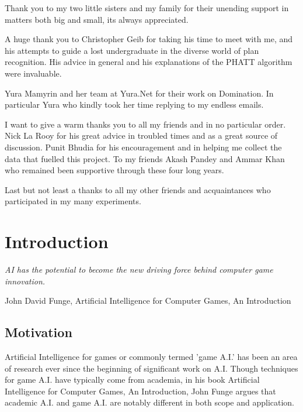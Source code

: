 \documentclass[parskip]{cs4rep}
\begin{document}
Thank you to my two little sisters and my family for their unending support in matters both big and small, its always appreciated. 

A huge thank you to Christopher Geib for taking his time to meet with me, and his attempts to guide a lost undergraduate in the diverse world of plan recognition. His advice in general and his explanations of the PHATT algorithm were invaluable. 

Yura Mamyrin and her team at Yura.Net for their work on Domination. In particular Yura who kindly took her time replying to my endless emails.

I want to give a warm thanks you to all my friends and in no particular order. Nick La Rooy for his great advice in troubled times and as a great source of discussion. Punit Bhudia for his encouragement and in helping me collect the data that fuelled this project. To my friends Akash Pandey and Ammar Khan who remained been supportive through these four long years. 

Last but not least a thanks to all my other friends and acquaintances who participated in my many experiments.

\tableofcontents


\chapter{Introduction}

\begin{flushleft}
\textit{AI has the potential to become the new driving force behind computer game innovation.}
\end{flushleft}
\begin{flushleft}
John David Funge, Artificial Intelligence for Computer Games, An Introduction
\end{flushleft}

\section{Motivation}

Artificial Intelligence for games or commonly termed 'game A.I.' has been an area of research ever since the beginning of significant work on A.I. Though techniques for game A.I. have typically come from academia, in his book Artificial Intelligence for Computer Games, An Introduction, John Funge argues \cite{JohnFunge:AIForComp} that academic A.I. and game A.I. are notably different in both scope and application.
\end{document}
